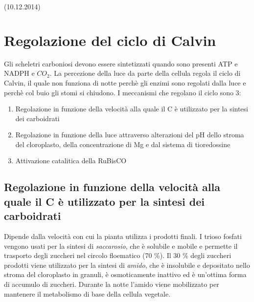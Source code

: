\documentclass[a4paper,12pt]{book}
\begin{document}
(10.12.2014)

\section{Regolazione del ciclo di Calvin}
Gli scheletri carboniosi devono essere sintetizzati quando sono presenti ATP e NADPH e $CO_{2}$. La percezione della luce da parte della cellula regola il ciclo di Calvin, il quale non funziona di notte perchè gli enzimi sono regolati dalla luce e perchè col buio gli stomi si chiudono. I meccanismi che regolano il ciclo sono 3:
\begin{enumerate}
\item{Regolazione in funzione della velocità alla quale il C è utilizzato per la sintesi dei carboidrati}
\item{Regolazione in funzione della luce attraverso alterazioni del pH dello stroma del cloroplasto, della concentrazione di Mg e dal sistema di tioredossine}
\item{Attivazione catalitica della RuBisCO}
\end{enumerate}

\subsection{Regolazione in funzione della velocità alla quale il C è utilizzato per la sintesi dei carboidrati}

Dipende dalla velocità con cui la pianta utilizza i prodotti finali. I trioso fosfati vengono usati per la sintesi di \emph{saccarosio}, che è solubile e mobile e permette il trasporto degli zuccheri nel circolo floematico (70 \%). Il 30 \% degli zuccheri prodotti viene utilizzato per la sintesi di \emph{amido}, che è insolubile e depositato nello stroma del cloroplasto in granuli, è osmoticamente inattivo ed è un'ottima forma di accumulo di zuccheri. Durante la notte l'amido viene mobilizzato per mantenere il metabolismo di base della cellula vegetale.
\end{document}
